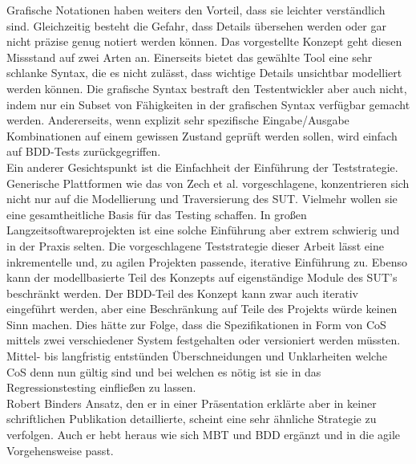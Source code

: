 Grafische Notationen haben weiters den Vorteil, dass sie leichter verständlich sind. Gleichzeitig besteht die Gefahr, dass Details übersehen werden oder gar nicht präzise genug notiert werden können. Das vorgestellte Konzept geht diesen Missstand auf zwei Arten an. Einerseits bietet das gewählte Tool eine sehr schlanke Syntax, die es nicht zulässt, dass wichtige Details unsichtbar modelliert werden können. Die grafische Syntax bestraft den Testentwickler aber auch nicht, indem nur ein Subset von Fähigkeiten in der grafischen Syntax verfügbar gemacht werden. Andererseits, wenn explizit sehr spezifische Eingabe/Ausgabe Kombinationen auf einem gewissen Zustand geprüft werden sollen, wird einfach auf BDD-Tests zurückgegriffen.\\
Ein anderer Gesichtspunkt ist die Einfachheit der Einführung der Teststrategie. Generische Plattformen wie das von Zech et al.\cite{zech_generic_2012} vorgeschlagene, konzentrieren sich nicht nur auf die Modellierung und Traversierung des SUT. Vielmehr wollen sie eine gesamtheitliche Basis für das Testing schaffen. In großen Langzeitsoftwareprojekten ist eine solche Einführung aber extrem schwierig und in der Praxis selten. Die vorgeschlagene Teststrategie dieser Arbeit lässt eine inkrementelle und, zu agilen Projekten passende, iterative Einführung zu. Ebenso kann der modellbasierte Teil des Konzepts auf eigenständige Module des SUT's beschränkt werden. Der BDD-Teil des Konzept kann zwar auch iterativ eingeführt werden, aber eine Beschränkung auf Teile des Projekts würde keinen Sinn machen. Dies hätte zur Folge, dass die Spezifikationen in Form von CoS mittels zwei verschiedener System festgehalten oder versioniert werden müssten. Mittel- bis langfristig entstünden Überschneidungen und Unklarheiten welche CoS denn nun gültig sind und bei welchen es nötig ist sie in das Regressionstesting einfließen zu lassen.\\
Robert Binders Ansatz, den er in einer Präsentation\cite{binder_model-based_2014} erklärte aber in keiner schriftlichen Publikation detaillierte, scheint eine sehr ähnliche Strategie zu verfolgen. Auch er hebt heraus wie sich MBT und BDD ergänzt und in die agile Vorgehensweise passt.


